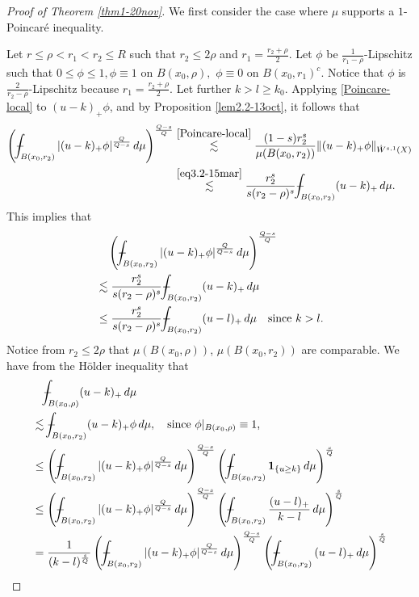 \documentclass[11pt,leqno]{amsart}
\def\Xint#1{\mathchoice
	{\XXint\displaystyle\textstyle{#1}}
	{\XXint\textstyle\scriptstyle{#1}}
	{\XXint\scriptstyle\scriptscriptstyle{#1}}
	{\XXint\scriptscriptstyle\scriptscriptstyle{#1}}
	\!\int}
\def\XXint#1#2#3{{\setbox0=\hbox{$#1{#2#3}{\int}$ }
		\vcenter{\hbox{$#2#3$ }}\kern-.6\wd0}}
\def\dashint{\Xint-}
\numberwithin{equation}{section}
\theoremstyle{definition}
\begin{document}
	\begin{proof}[Proof of Theorem \ref{thm1-20nov}]
		We first consider the case where $\mu$ supports a $1$-Poincar\'e inequality.
		
		Let $r\leq \rho<r_1<r_2\leq R$ such that $r_2\leq 2\rho$ and $r_1=\frac{r_2+\rho}{2}$.
		Let $\phi$ be $\frac{1}{r_1-\rho}$-Lipschitz such that $0\leq \phi\leq 1, \phi\equiv 1$
		on $B({x_0,\rho}),$ $\phi\equiv 0$ on $B(x_0,r_1)^c$. Notice that $\phi$ is
		$\frac{2}{r_2-\rho}$-Lipschitz because $r_1=\frac{r_2+\rho}{2}$.
		Let further $k>l\geq k_0$. Applying \eqref{Poincare-local}
		to $(u-k)_+\phi$, and by Proposition \ref{lem2.2-13oct}, it follows that 
		\begin{align*}
			\left( \dashint_{B(x_0,r_2)} |(u-k)_+ \phi|^{\frac{Q}{Q-s}} \, d\mu \right)^{\frac{Q-s}{Q}} 
			&\overset{\eqref{Poincare-local}}{\lesssim}  \frac{(1-s) r_2^s}{\mu(B(x_0,r_2))}  \|  (u-k)_+ \phi\|_{\dot W^{s,1}(X)}  \\
			&\overset{\eqref{eq3.2-15mar}}{ \lesssim }  \frac{r_2^s}{s(r_2-\rho)^s} \dashint_{B(x_0,r_2)} (u-k)_+\,  d\mu.
		\end{align*}
		This implies that
		\begin{align}
			&\quad \left( \dashint_{B(x_0,r_2)} |(u-k)_+ \phi|^{\frac{Q}{Q-s}} \, d\mu \right)^{\frac{Q-s}{Q}}\notag \\
			&\lesssim  \frac{r_2^s}{s(r_2-\rho)^s} \dashint_{B(x_0,r_2)} (u-k)_+\,  d\mu\notag \\
			&\leq  \frac{r_2^s}{s(r_2-\rho)^s} \dashint_{B(x_0,r_2)} (u-l)_+\,  d\mu\quad 
			\textrm{since\ }k>l.  \label{eq3-3oct}
		\end{align}
		Notice from  $r_2\leq 2\rho$ that  $\mu(B(x_0,\rho))$, $\mu(B(x_0,r_2))$ are comparable.
		We have from the H\"older inequality that
		\begin{align*}
			&\quad \dashint_{B(x_0,\rho)} (u-k)_+\,d\mu\\
			&\lesssim   \dashint_{B(x_0,r_2)} (u-k)_+\phi \, d\mu, \quad \text{since $\phi|_{B(x_0,\rho)}\equiv 1$,}\\
			&\leq \left( \dashint_{B(x_0,r_2)} |(u-k)_+\phi|^{\frac{Q}{Q-s}} \,d\mu\right)^{\frac{Q-s}{Q}} \left( \dashint_{B(x_0,r_2)} {\bf 1}_{\{ u\geq k\}}\, d\mu\right)^{\frac{s}{Q}}\\
			&\leq \left( \dashint_{B(x_0,r_2)} |(u-k)_+\phi|^{\frac{Q}{Q-s}} \,d\mu\right)^{\frac{Q-s}{Q}} \left( \dashint_{B(x_0,r_2)} \frac{(u-l)_+}{k-l}\, d\mu\right)^{\frac{s}{Q}}\\
			&= \frac{1}{(k-l)^{\frac{s}{Q}}}\left( \dashint_{B(x_0,r_2)} |(u-k)_+\phi|^{\frac{Q}{Q-s}} \,d\mu\right)^{\frac{Q-s}{Q}} \left( \dashint_{B(x_0,r_2)} {(u-l)_+}\, d\mu\right)^{\frac{s}{Q}}\\

\end{align*}
\end{proof}
\end{document}
